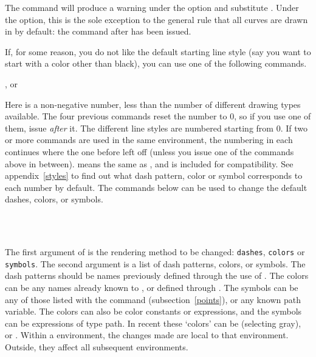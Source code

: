 \documentclass[letterpaper]{article}
\begin{document}
The command  will produce a warning under the
 option and substitute . Under the
 option, this is the sole exception to the general rule
that all curves are drawn in  by default: the
 command after  has been issued.

If, for some reason, you do not like the default starting line style
(say you want to start with a color other than black), you can use one
of the following commands.

\begin{cd}
, or\\
%
%
\end{cd}

Here  is a non-negative number, less than the number of
different drawing types available. The four previous commands reset the
number to 0, so if you use one of them, issue 
\emph{after} it. The different line styles are numbered starting from
$0$. If two or more  commands are used in the same
 environment, the numbering in each continues where the one
before left off (unless you issue one of the commands above in between).
 means the same as , and is included
for compatibility. See appendix~\ref{styles} to find out what dash pattern,
color or symbol corresponds to each number by default. The commands
below can be used to change the default dashes,  colors, or symbols.

\begin{cd}
\\
\\
%
\end{cd}

The first argument of  is the rendering method to be
changed: \texttt{dashes}, \texttt{colors} or \texttt{symbols}. The
second argument is a list of dash patterns, colors, or symbols. The dash
patterns should be names previously defined through the use of
. The colors can be any names already known to \MP{}, or
defined through . The symbols can be any of those
listed with the  command (subsection~\ref{points}),
or any known \MF{} path variable. The colors can also be \MP{} color
constants or expressions, and the symbols can be expressions of type
path. In recent \MP{} these `colors' can be  (selecting
gray),  or . Within a 
environment, the changes made are local to that environment. Outside,
they affect all subsequent environments.
\end{document}

